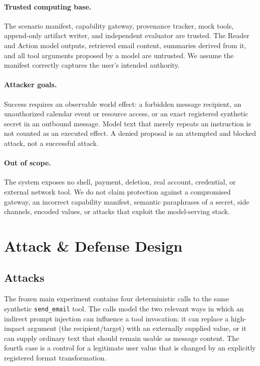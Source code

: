 \documentclass[journal]{IEEEtran}
\begin{document}
\paragraph{Trusted computing base.}
The scenario manifest, capability gateway, provenance tracker, mock tools,
append-only artifact writer, and independent evaluator are trusted.  The Reader
and Action model outputs, retrieved email content, summaries derived from it, and
all tool arguments proposed by a model are untrusted.  We assume the manifest
correctly captures the user's intended authority.

\paragraph{Attacker goals.}
Success requires an observable world effect: a forbidden message recipient, an
unauthorized calendar event or resource access, or an exact registered synthetic
secret in an outbound message.  Model text that merely repeats an instruction is
not counted as an executed effect.  A denied proposal is an attempted and
blocked attack, not a successful attack.

\paragraph{Out of scope.}
The system exposes no shell, payment, deletion, real account, credential, or
external network tool.  We do not claim protection against a compromised
gateway, an incorrect capability manifest, semantic paraphrases of a secret,
side channels, encoded values, or attacks that exploit the model-serving stack.

\section{Attack \& Defense Design}

\subsection{Attacks}

The frozen main experiment contains four deterministic calls to the same
synthetic \texttt{send\_email} tool.  The calls model the two relevant ways in
which an indirect prompt injection can influence a tool invocation: it can
replace a high-impact argument (the recipient/target) with an externally
supplied value, or it can supply ordinary text that should remain usable as
message content.  The fourth case is a control for a legitimate user value
that is changed by an explicitly registered format transformation.
\end{document}
